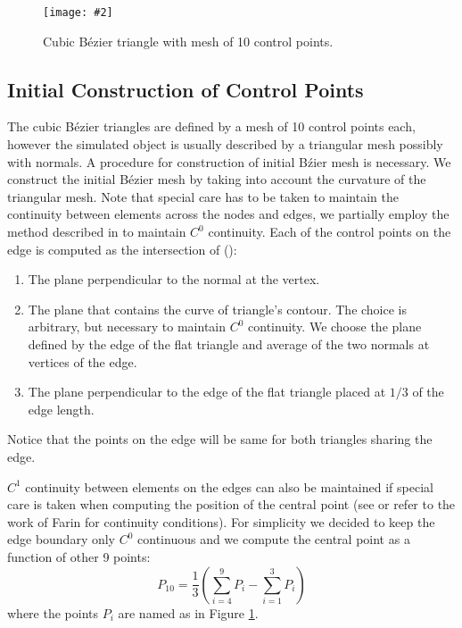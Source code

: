 \documentclass{egpubl}
\newcommand{\Figure}[3]{%
\begin{figure}[htb]
  \centering
  \texttt{[image: \#2]}
  \caption{\label{fig-#2}#3}
\end{figure}}
\newcommand{\CD}[1]{{\color{magenta}{\textbf{C: #1}}}}
\begin{document}
\Figure{0.8\linewidth}{bezier2}
{Cubic B\'ezier triangle with mesh of 10 control points.}


\subsection{Initial Construction of Control Points} %

The cubic B\'ezier triangles are defined by a mesh of 10 control points each, however the
simulated object is usually described by a triangular mesh possibly with normals.
A procedure for construction of initial B\'zier mesh is necessary.
We construct the initial B\'ezier mesh by taking into account the curvature of the triangular
mesh. Note that special care has to be taken to maintain
the continuity between elements across the nodes and edges, 
we partially employ the method described in \cite{Ubach2010} to maintain
$C^0$ continuity. Each of the control points on the edge is
computed as the intersection of (\CD{Need to do a figure of this}):

\begin{enumerate}
    \item The plane perpendicular to the normal at the vertex.
    \item The plane that contains the curve of triangle's contour. The
        choice is arbitrary, but necessary to maintain $C^0$ continuity. 
        We choose the plane defined by the edge of the flat triangle and
        average of the two normals at vertices of the edge. 
    \item The plane perpendicular to the edge of the flat triangle placed at
        $1/3$ of the edge length.
\end{enumerate}

Notice that the points on the edge will be same for both triangles sharing
the edge.

$C^1$ continuity between elements on the edges can also be maintained if special care is taken
when computing the position of the central point
(see \cite{Ubach2010} or refer to the work of Farin \cite{Farin2002} for continuity conditions). 
For simplicity we decided to keep the edge boundary only $C^0$ continuous and we compute the central point as a function of other 9 points: 
%
\begin{equation}\label{eq-central}
    P_{10} = \frac{1}{3}(\sum_{i=4}^9 P_i - \sum_{i=1}^3 P_i)
\end{equation}
%
where the points $P_i$ are named as in Figure \ref{fig-bezier2}.
\end{document}
